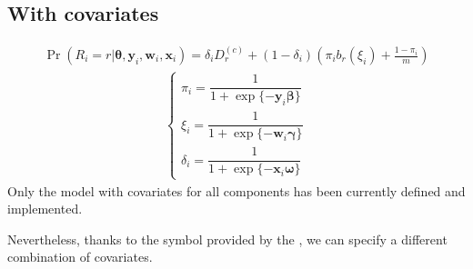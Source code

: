\documentclass[letterpaper,10pt,english]{sphinxmanual}
\begin{document}
\subsection{With covariates}
\label{\detokenize{manual:cubsh-with-covariates}}\label{\detokenize{manual:id77}}
\sphinxAtStartPar
{}
\begin{equation*}
\begin{split}\Pr(R_i=r|\pmb\theta, \pmb y_i, \pmb w_i, \pmb x_i) = \delta_i D_r^{(c)} + (1-\delta_i)\left(\pi_i b_r(\xi_i) + \frac{1-\pi_i}{m} \right)\end{split}
\end{equation*}\begin{equation*}
\begin{split}\left\{
\begin{array}{l}
    \pi_i = \dfrac{1}{1+\exp\{-\pmb y_i \pmb \beta\}}
    \\
    \xi_i = \dfrac{1}{1+\exp\{-\pmb w_i \pmb \gamma\}}
    \\
    \delta_i = \dfrac{1}{1+\exp\{-\pmb x_i \pmb \omega\}}
\end{array}
\right.\end{split}
\end{equation*}
\sphinxAtStartPar
Only the model with covariates for all components has been
currently defined and implemented.

\sphinxAtStartPar
Nevertheless, thanks to the symbol  provided by the
, we can specify a different combination
of covariates.
\end{document}
